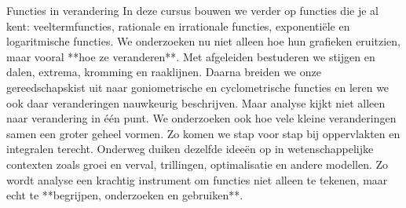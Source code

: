 
\ifdefined\HCode
\else
  \FVDmoduleopening
    {Functies in verandering}
    {In deze cursus bouwen we verder op functies die je al kent: veeltermfuncties, rationale en irrationale functies, exponentiële en logaritmische functies. We onderzoeken nu niet alleen hoe hun grafieken eruitzien, maar vooral **hoe ze veranderen**. Met afgeleiden bestuderen we stijgen en dalen, extrema, kromming en raaklijnen. Daarna breiden we onze gereedschapskist uit naar goniometrische en cyclometrische functies en leren we ook daar veranderingen nauwkeurig beschrijven. Maar analyse kijkt niet alleen naar verandering in één punt. We onderzoeken ook hoe vele kleine veranderingen samen een groter geheel vormen. Zo komen we stap voor stap bij oppervlakten en integralen terecht. Onderweg duiken dezelfde ideeën op in wetenschappelijke contexten zoals groei en verval, trillingen, optimalisatie en andere modellen. Zo wordt analyse een krachtig instrument om functies niet alleen te tekenen, maar echt te **begrijpen, onderzoeken en gebruiken**.}
    {%
    }
\fi
